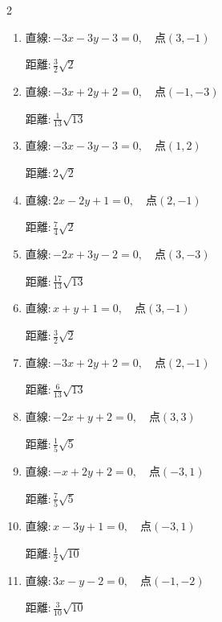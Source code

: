 \begin{multicols}{2}
\begin{enumerate}
        $\displaystyle 距離 : \frac{1}{2}\sqrt{2}$

  \item $直線:-3x-3y-3=0,\quad 点 ( 3, -1 )$

        $\displaystyle 距離 : \frac{3}{2}\sqrt{2}$

\columnbreak %

  \item $直線:-3x+2y+2=0,\quad 点 ( -1, -3 )$

        $\displaystyle 距離 : \frac{1}{13}\sqrt{13}$

  \item $直線:-3x-3y-3=0,\quad 点 ( 1, 2 )$

        $\displaystyle 距離 : 2\sqrt{2}$

  \item $直線:2x-2y+1=0,\quad 点 ( 2, -1 )$

        $\displaystyle 距離 : \frac{7}{4}\sqrt{2}$

  \item $直線:-2x+3y-2=0,\quad 点 ( 3, -3 )$

        $\displaystyle 距離 : \frac{17}{13}\sqrt{13}$

  \item $直線:x+y+1=0,\quad 点 ( 3, -1 )$

        $\displaystyle 距離 : \frac{3}{2}\sqrt{2}$

  \item $直線:-3x+2y+2=0,\quad 点 ( 2, -1 )$

        $\displaystyle 距離 : \frac{6}{13}\sqrt{13}$

  \item $直線:-2x+y+2=0,\quad 点 ( 3, 3 )$

        $\displaystyle 距離 : \frac{1}{5}\sqrt{5}$

  \item $直線:-x+2y+2=0,\quad 点 ( -3, 1 )$

        $\displaystyle 距離 : \frac{7}{5}\sqrt{5}$

  \item $直線:x-3y+1=0,\quad 点 ( -3, 1 )$

        $\displaystyle 距離 : \frac{1}{2}\sqrt{10}$

  \item $直線:3x-y-2=0,\quad 点 ( -1, -2 )$

        $\displaystyle 距離 : \frac{3}{10}\sqrt{10}$

\columnbreak %


\end{enumerate}
\end{multicols}
